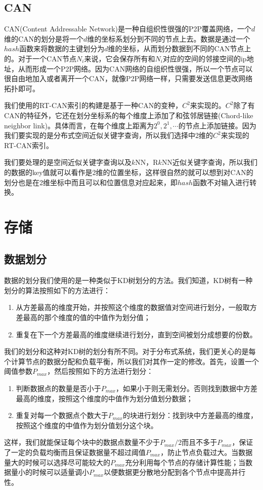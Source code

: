 \documentclass{ML}
\begin{document}
\subsection{CAN}
CAN(Content Addressable Network)是一种自组织性很强的P2P覆盖网络，一个$d$维的CAN的划分是将一个$d$维的坐标系划分到不同的节点上去。数据是通过一个$hash$函数来将数据的主键划分为$d$维的坐标，从而划分数据到不同的CAN节点上的。对于一个CAN节点$N_i$来说，它会保存所有和$N_i$对应的空间的邻接空间的ip地址，从而形成一个P2P网络。因为CAN网络的自组织性很强，所以一个节点可以很自由地加入或者离开一个CAN，就像P2P网络一样，只需要发送信息更改网络拓扑即可。

我们使用的RT-CAN索引的构建是基于一种CAN的变种，$C^2$来实现的。$C^2$除了有CAN的特征外，它还在划分坐标系的每个维度上添加了和弦邻居链接(Chord-like neighbor link)。具体而言，在每个维度上距离为$2^0,2^1,\cdots$的节点上添加链接。因为我们要实现的是分布式空间近似关键字查询，所以我们选择中2维的$C^2$来实现的RT-CAN索引。

我们要处理的是空间近似关键字查询以及$k$NN，R$k$NN近似关键字查询，所以我们的数据的key值就可以看作是2维的位置坐标，这样很自然的就可以想到对CAN的划分也是在2维坐标中而且可以和位置信息对应起来，即$hash$函数不对输入进行转换。

\section{存储}
\subsection{数据划分}\label{sec:data-partition}
数据的划分我们使用的是一种类似于KD树划分的方法。我们知道\cite{KD-Tree-Partition}，KD树有一种划分的算法按照如下的方法进行：
\begin{enumerate}
  \item 从方差最高的维度开始，并按照这个维度的数据值对空间进行划分，一般取方差最高的那个维度的值的中值作为划分值；
  \item 重复在下一个方差最高的维度继续进行划分，直到空间被划分成想要的份数。 
\end{enumerate}
我们的划分和这种对KD树的划分有所不同。对于分布式系统，我们更关心的是每个计算节点的数据分配和负载平衡，所以我们对其作一定的修改。首先，设置一个阈值参数$P_{max}$，然后按照如下的方法进行划分：
\begin{enumerate}
  \item 判断数据点的数量是否小于$P_{max}$，如果小于则无需划分。否则找到数据中方差最高的维度，按照这个维度的中值作为划分值划分数据；
  \item 重复对每一个数据点个数大于$P_{max}$的块进行划分：找到块中方差最高的维度，按照这个维度的中值作为划分值划分这个块。 
\end{enumerate}
这样，我们就能保证每个块中的数据点数量不少于$P_{max}/2$而且不多于$P_{max}$，保证了一定的负载均衡而且保证数据量不超过阈值$P_{max}$，防止节点负载过大。当数据量大的时候可以选择尽可能较大的$P_{max}$充分利用每个节点的存储计算性能；当数据量小的时候可以适量调小$P_{max}$以便数据更分散地分配到各个节点中提高并行性。
\end{document}
